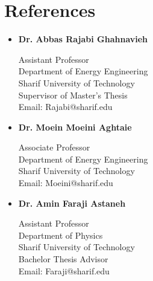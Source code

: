 \documentclass[letter,20pt]{article}
\begin{document}

\section{\textbf{References}}

\vspace{5pt}



\begin{itemize}
[
leftmargin=3ex
]


\item
\textbf{Dr. Abbas Rajabi Ghahnavieh}

\vspace{2pt}

Assistant Professor\\
Department of Energy Engineering\\
Sharif University of Technology\\

Supervisor of Master's Thesis\\

Email:
Rajabi@sharif.edu


\vspace{10pt}



\item
\textbf{Dr. Moein Moeini Aghtaie}

\vspace{2pt}

Associate Professor\\
Department of Energy Engineering\\
Sharif University of Technology\\

Email:
Moeini@sharif.edu



\vspace{10pt}



\item
\textbf{Dr. Amin Faraji Astaneh}

\vspace{2pt}

Assistant Professor\\
Department of Physics\\
Sharif University of Technology\\

Bachelor Thesis Advisor\\

Email:
Faraji@sharif.edu



\end{itemize}
\end{document}
